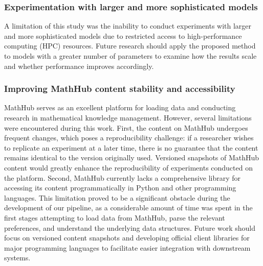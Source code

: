 \subsubsection{Experimentation with larger and more sophisticated models}
A limitation of this study was the inability to conduct experiments with larger and more sophisticated models due to restricted access to high-performance computing (HPC) resources. Future research should apply the proposed method to models with a greater number of parameters to examine how the results scale and whether performance improves accordingly.

\subsubsection{Improving MathHub content stability and accessibility}
MathHub serves as an excellent platform for loading data and conducting research in mathematical knowledge management. However, several limitations were encountered during this work. First, the content on MathHub undergoes frequent changes, which poses a reproducibility challenge: if a researcher wishes to replicate an experiment at a later time, there is no guarantee that the content remains identical to the version originally used. Versioned snapshots of MathHub content would greatly enhance the reproducibility of experiments conducted on the platform. Second, MathHub currently lacks a comprehensive library for accessing its content programmatically in Python and other programming languages. This limitation proved to be a significant obstacle during the development of our pipeline, as a considerable amount of time was spent in the first stages attempting to load data from MathHub, parse the relevant preferences, and understand the underlying data structures. Future work should focus on versioned content snapshots and developing official client libraries for major programming languages to facilitate easier integration with downstream systems.